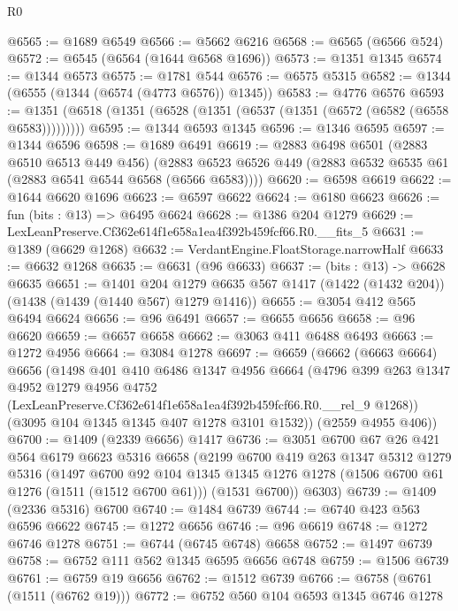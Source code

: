 \begin{lexlean}{R0}
\begin{coremodule}
@6565 := @1689 @6549
@6566 := @5662 @6216
@6568 := @6565 (@6566 @524)
@6572 := @6545 (@6564 (@1644 @6568 @1696))
@6573 := @1351 @1345
@6574 := @1344 @6573
@6575 := @1781 @544
@6576 := @6575 @5315
@6582 := @1344 (@6555 (@1344 (@6574 (@4773 @6576)) @1345))
@6583 := @4776 @6576
@6593 := @1351 (@6518 (@1351 (@6528 (@1351 (@6537 (@1351 (@6572 (@6582 (@6558 @6583)))))))))
@6595 := @1344 @6593 @1345
@6596 := @1346 @6595
@6597 := @1344 @6596
@6598 := @1689 @6491
@6619 := @2883
    @6498
    @6501
    (@2883 @6510 @6513 @449 @456)
    (@2883 @6523 @6526 @449 (@2883 @6532 @6535 @61 (@2883 @6541 @6544 @6568 (@6566 @6583))))
@6620 := @6598 @6619
@6622 := @1644 @6620 @1696
@6623 := @6597 @6622
@6624 := @6180 @6623
@6626 := fun (bits : @13) => @6495 @6624
@6628 := @1386 @204 @1279
@6629 := LexLeanPreserve.Cf362e614f1e658a1ea4f392b459fcf66.R0.__fits_5
@6631 := @1389 (@6629 @1268)
@6632 := VerdantEngine.FloatStorage.narrowHalf
@6633 := @6632 @1268
@6635 := @6631 (@96 @6633)
@6637 := (bits : @13) -> @6628 @6635
@6651 := @1401
    @204
    @1279
    @6635
    @567
    @1417
    (@1422 (@1432 @204))
    (@1438 (@1439 (@1440 @567) @1279 @1416))
@6655 := @3054 @412 @565 @6494 @6624
@6656 := @96 @6491
@6657 := @6655 @6656
@6658 := @96 @6620
@6659 := @6657 @6658
@6662 := @3063 @411 @6488 @6493
@6663 := @1272 @4956
@6664 := @3084 @1278
@6697 := @6659
    (@6662
      (@6663 @6664)
      @6656
      (@1498
        @401
        @410
        @6486
        @1347
        @4956
        @6664
        (@4796
          @399
          @263
          @1347
          @4952
          @1279
          @4956
          @4752
          (LexLeanPreserve.Cf362e614f1e658a1ea4f392b459fcf66.R0.__rel_9 @1268))
        (@3095 @104 @1345 @1345 @407 @1278 @3101 @1532))
      (@2559 @4955 @406))
@6700 := @1409 (@2339 @6656) @1417
@6736 := @3051
    @6700
    @67
    @26
    @421
    @564
    @6179
    @6623
    @5316
    @6658
    (@2199
      @6700
      @419
      @263
      @1347
      @5312
      @1279
      @5316
      (@1497
        @6700
        @92
        @104
        @1345
        @1345
        @1276
        @1278
        (@1506 @6700 @61 @1276 (@1511 (@1512 @6700 @61)))
        (@1531 @6700))
      @6303)
@6739 := @1409 (@2336 @5316) @6700
@6740 := @1484 @6739
@6744 := @6740 @423 @563 @6596 @6622
@6745 := @1272 @6656
@6746 := @96 @6619
@6748 := @1272 @6746 @1278
@6751 := @6744 (@6745 @6748) @6658
@6752 := @1497 @6739
@6758 := @6752 @111 @562 @1345 @6595 @6656 @6748
@6759 := @1506 @6739
@6761 := @6759 @19 @6656
@6762 := @1512 @6739
@6766 := @6758 (@6761 (@1511 (@6762 @19)))
@6772 := @6752 @560 @104 @6593 @1345 @6746 @1278

\end{coremodule}
\end{lexlean}
